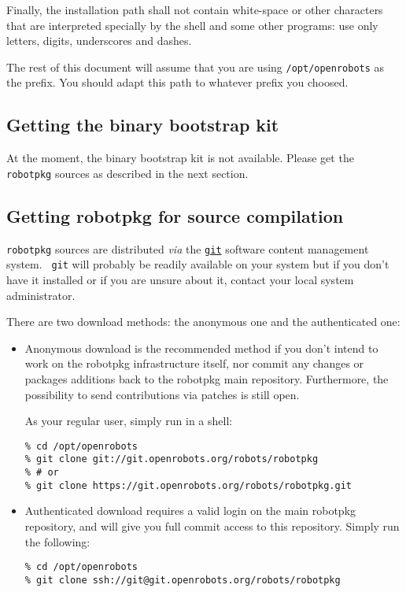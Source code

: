 Finally,  the  installation  path   shall  not  contain  white-space  or  other
characters that are interpreted specially by the shell and some other programs:
use only letters, digits, underscores and dashes.

The rest of this document will  assume that you are using {\tt /opt/openrobots}
as the prefix. You should adapt this path to whatever prefix you choosed.


\subsection{Getting the binary bootstrap kit}

At the moment, the  binary bootstrap kit is not  available. Please get the {\tt
robotpkg} sources as described in the next section.


\subsection{Getting robotpkg for source compilation}

{\tt         robotpkg}    sources   are       distributed     {\em    via}  the
\href{http://git-scm.com/}{\tt git}  software  content management system.  {\tt
git} will probably be readily available on your system but if you don't have it
installed   or if you    are  unsure  about it,   contact  your  local   system
administrator.

There are two download methods: the anonymous one and the authenticated
one:

\begin{itemize}

  \item  Anonymous download is the  recommended method if  you  don't intend to
  work on  the   robotpkg infrastructure  itself,  nor commit   any  changes or
  packages  additions  back to  the  robotpkg main repository. Furthermore, the
  possibility to send contributions via patches is still open.

  As your regular user, simply run in a shell:

\begin{verbatim}
% cd /opt/openrobots
% git clone git://git.openrobots.org/robots/robotpkg
% # or
% git clone https://git.openrobots.org/robots/robotpkg.git
\end{verbatim}


  \item Authenticated   download requires a  valid  login on the  main robotpkg
  repository, and will give you full commit access  to this repository.  Simply
  run the following:

\begin{verbatim}
% cd /opt/openrobots
% git clone ssh://git@git.openrobots.org/robots/robotpkg
\end{verbatim}

\end{itemize}



